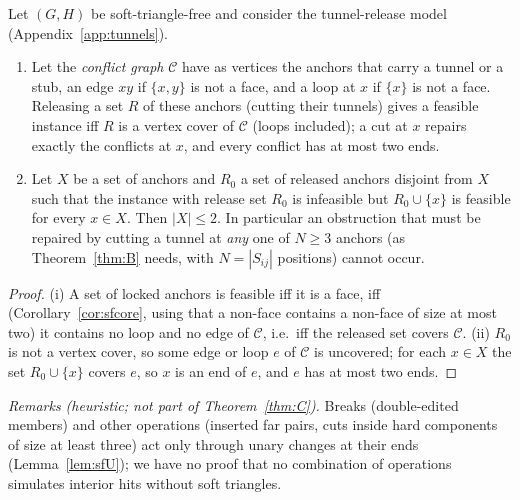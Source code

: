 \begin{theorem}\label{thm:C}
Let $(G,H)$ be soft-triangle-free and consider the tunnel-release model (Appendix~\ref{app:tunnels}).
\begin{enumerate}
\item[(i)] Let the \emph{conflict graph} $\mathcal C$ have as vertices the anchors that carry a tunnel or a stub, an edge $xy$ if $\{x,y\}$ is not a face, and a loop at $x$ if $\{x\}$ is not a face. Releasing a set $R$ of these anchors (cutting their tunnels) gives a feasible instance iff $R$ is a vertex cover of $\mathcal C$ (loops included); a cut at $x$ repairs exactly the conflicts at $x$, and every conflict has at most two ends.
\item[(ii)] Let $X$ be a set of anchors and $R_0$ a set of released anchors disjoint from $X$ such that the instance with release set $R_0$ is infeasible but $R_0\cup\{x\}$ is feasible for every $x\in X$. Then $|X|\le2$. In particular an obstruction that must be repaired by cutting a tunnel at \emph{any} one of $N\ge3$ anchors (as Theorem~\ref{thm:B} needs, with $N=|S_{ij}|$ positions) cannot occur.
\end{enumerate}
\end{theorem}
\begin{proof}
(i) A set of locked anchors is feasible iff it is a face, iff (Corollary~\ref{cor:sfcore}, using that a non-face contains a non-face of size at most two) it contains no loop and no edge of $\mathcal C$, i.e.\ iff the released set covers $\mathcal C$. (ii) $R_0$ is not a vertex cover, so some edge or loop $e$ of $\mathcal C$ is uncovered; for each $x\in X$ the set $R_0\cup\{x\}$ covers $e$, so $x$ is an end of $e$, and $e$ has at most two ends.
\end{proof}
\emph{Remarks (heuristic; not part of Theorem~\ref{thm:C}).} Breaks (double-edited members) and other operations (inserted far pairs, cuts inside hard components of size at least three) act only through unary changes at their ends (Lemma~\ref{lem:sfU}); we have no proof that no combination of operations simulates interior hits without soft triangles.

